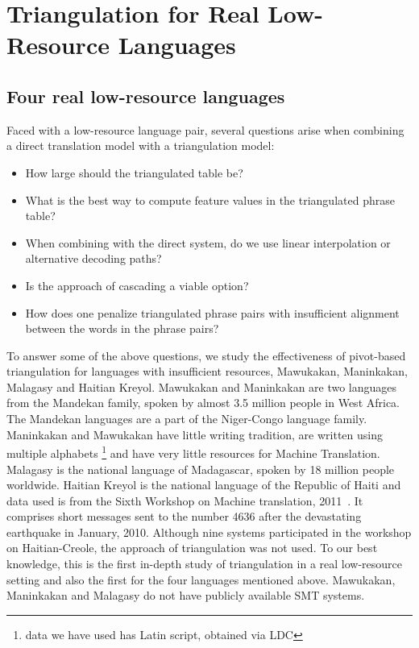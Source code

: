 \chapter{Triangulation for Real Low-Resource Languages}
\label{chapter:reality}

\section{Four real low-resource languages}

Faced with a low-resource language pair, several questions arise when combining a direct translation model with a triangulation model:
\begin{itemize}\addtolength{\itemsep}{-0.4\baselineskip}
        \item How large should the triangulated table be?
        \item What is the best way to compute feature values in the triangulated phrase table?
        \item When combining with the direct system, do we use linear interpolation or alternative decoding paths?
        \item Is the approach of cascading a viable option?
        \item How does one penalize triangulated phrase pairs with insufficient alignment between the words in the phrase pairs?
\end{itemize}

To answer some of the above questions, we study the effectiveness of pivot-based triangulation for languages with insufficient resources, Mawukakan, Maninkakan, Malagasy and Haitian Kreyol. Mawukakan and Maninkakan are two languages from the Mandekan family, spoken by almost 3.5 million people in West Africa. The Mandekan languages are a part of the Niger-Congo language family. Maninkakan and Mawukakan have little writing tradition, are written using multiple alphabets \footnote{data we have used has Latin script, obtained via LDC} and have very little resources for Machine Translation. Malagasy is the national language of Madagascar, spoken by 18 million people worldwide. Haitian Kreyol is the national language of the Republic of Haiti and data used is from the Sixth Workshop on Machine translation, 2011~\cite{WMT:11}. It comprises short messages sent to the number 4636 after the devastating earthquake in January, 2010. Although nine systems participated in the workshop on Haitian-Creole, the approach of triangulation was not used. To our best knowledge, this is the first in-depth study of triangulation in a real low-resource setting and also the first for the four languages mentioned above. Mawukakan, Maninkakan and Malagasy do not have publicly available SMT systems. 

